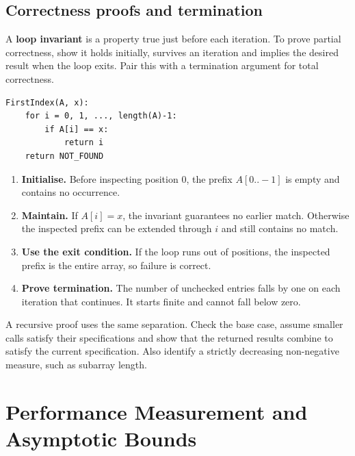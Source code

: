 \documentclass[12pt,a4paper]{article}
\begin{document}
\subsection{Correctness proofs and termination}
\begin{tcolorbox}[defbox, title={Loop invariant}]
A \textbf{loop invariant} is a property true just before each iteration. To prove partial correctness, show it holds initially, survives an iteration and implies the desired result when the loop exits. Pair this with a termination argument for total correctness.
\end{tcolorbox}

\begin{tcolorbox}[formulabox, title={Linear search for the first occurrence}]
\begin{verbatim}
FirstIndex(A, x):
    for i = 0, 1, ..., length(A)-1:
        if A[i] == x:
            return i
    return NOT_FOUND
\end{verbatim}
\end{tcolorbox}

\begin{tcolorbox}[examplebox, title={Proving linear search correct}]
\begin{enumerate}[leftmargin=*, itemsep=3pt, topsep=4pt]
  \item \textbf{Initialise.} Before inspecting position $0$, the prefix $A[0..-1]$ is empty and contains no occurrence.
  \item \textbf{Maintain.} If $A[i]=x$, the invariant guarantees no earlier match. Otherwise the inspected prefix can be extended through $i$ and still contains no match.
  \item \textbf{Use the exit condition.} If the loop runs out of positions, the inspected prefix is the entire array, so failure is correct.
  \item \textbf{Prove termination.} The number of unchecked entries falls by one on each iteration that continues. It starts finite and cannot fall below zero.
\end{enumerate}
\end{tcolorbox}

A recursive proof uses the same separation. Check the base case, assume smaller calls satisfy their specifications and show that the returned results combine to satisfy the current specification. Also identify a strictly decreasing non-negative measure, such as subarray length.

\section{Performance Measurement and Asymptotic Bounds}
\end{document}
